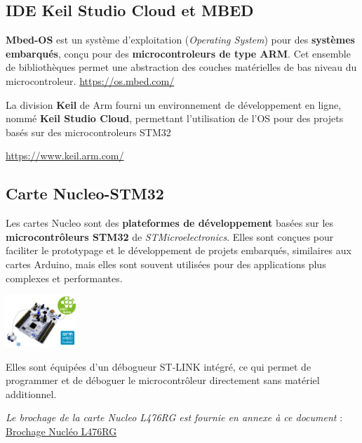 \documentclass[a4paper,11pt,titlepage]{article} %
\begin{document}
\subsection{IDE Keil Studio Cloud et MBED}

\textbf{Mbed-OS} est un système d'exploitation (\textit{Operating System}) pour des \textbf{systèmes embarqués}, conçu pour des \textbf{microcontroleurs de type ARM}. Cet ensemble de bibliothèques permet une abstraction des couches matérielles de bas niveau du microcontroleur. \href{https://os.mbed.com/}{https://os.mbed.com/}

La division \textbf{Keil} de Arm fourni un environnement de développement en ligne, nommé \textbf{Keil Studio Cloud}, permettant l'utilisation de l'OS pour des projets basés sur des microcontroleurs STM32

\href{https://www.keil.arm.com/}{https://www.keil.arm.com/}


\subsection{Carte Nucleo-STM32}

Les cartes Nucleo sont des \textbf{plateformes de développement} basées sur les \textbf{microcontrôleurs STM32} de \textit{STMicroelectronics}. Elles sont conçues pour faciliter le prototypage et le développement de projets embarqués, similaires aux cartes Arduino, mais elles sont souvent utilisées pour des applications plus complexes et performantes.


\begin{center}
	\includegraphics[width=0.2\textwidth]{images/nucleo_board.jpg}
\end{center}

Elles sont équipées d'un débogueur ST-LINK intégré, ce qui permet de programmer et de déboguer le microcontrôleur directement sans matériel additionnel.

\textsl{Le brochage de la carte Nucleo L476RG est fournie en annexe à ce document} : \hyperref[doc:nucleo_pins_476RG]{Brochage Nucléo L476RG}


\end{document}

